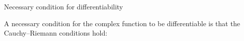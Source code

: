 \begin{EMunit}


\end{EMunit}

\EMhold


\begin{EMtheorem}{Necessary condition for differentiability}

A necessary condition for the complex function  to be differentiable is that the Cauchy--Riemann conditions hold:

\end{EMtheorem}

